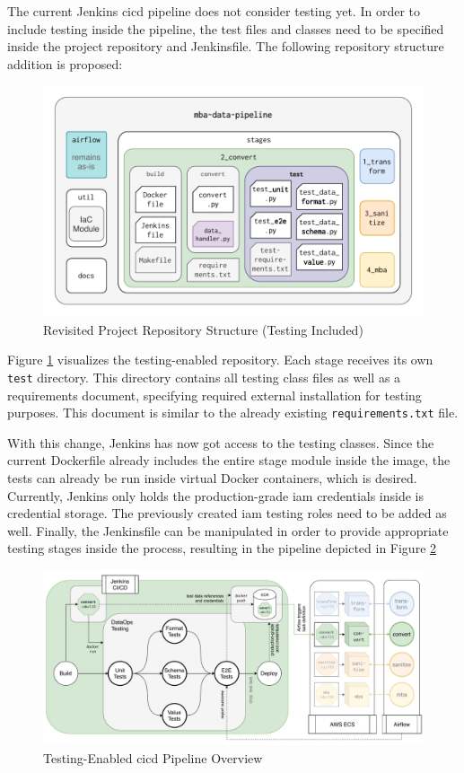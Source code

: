 The current Jenkins \ac{cicd} pipeline does not consider testing yet. In order to include testing inside the pipeline, the test files and classes need to be specified inside the project repository and Jenkinsfile. The following repository structure addition is proposed:

\begin{figure}[h!]
	\centering
	\includegraphics[width=\linewidth]{main-matter/img/5-repo-structure-new}
	\caption{Revisited Project Repository Structure (Testing Included)}
	\label{fig:5-new-repo}
\end{figure}

Figure \ref{fig:5-new-repo} visualizes the testing-enabled repository. Each stage receives its own \texttt{test} directory. This directory contains all testing class files as well as a requirements document, specifying required external installation for testing purposes. This document is similar to the already existing \texttt{requirements.txt} file.

With this change, Jenkins has now got access to the testing classes. Since the current Dockerfile already includes the entire stage module inside the image, the tests can already be run inside virtual Docker containers, which is desired. Currently, Jenkins only holds the production-grade \ac{iam} credentials inside is credential storage. The previously created \ac{iam} testing roles need to be added as well. Finally, the Jenkinsfile can be manipulated in order to provide appropriate testing stages inside the process, resulting in the pipeline depicted in Figure \ref{fig:5-cicd-testing}

\begin{figure}[h!]
	\centering
	\includegraphics[width=\linewidth]{main-matter/img/5-cicd-testing.pdf}
	\caption{Testing-Enabled \acs{cicd} Pipeline Overview}
	\label{fig:5-cicd-testing}
\end{figure}

